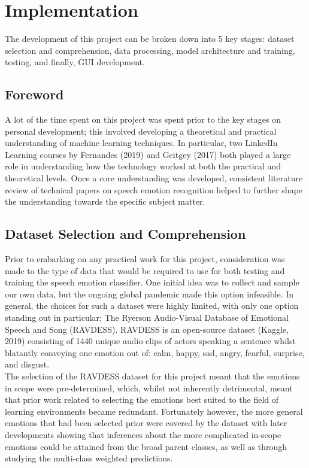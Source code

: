\documentclass[12pt]{article}
\begin{document}
\section{Implementation}
The development of this project can be broken down into 5 key stages: dataset selection and comprehension, data processing, model architecture and training, testing, and finally, GUI development.
\subsection{Foreword}
A lot of the time spent on this project was spent prior to the key stages on personal development; this involved developing a theoretical and practical understanding of machine learning techniques. In particular, two LinkedIn Learning courses by Fernandes (2019) and Geitgey (2017) both played a large role in understanding how the technology worked at both the practical and theoretical levels. Once a core understanding was developed, consistent literature review of technical papers on speech emotion recognition helped to further shape the understanding towards the specific subject matter. 
\subsection{Dataset Selection and Comprehension}
Prior to embarking on any practical work for this project, consideration was made to the type of data that would be required to use for both testing and training the speech emotion classifier. One initial idea was to collect and sample our own data, but the ongoing global pandemic made this option infeasible. In general, the choices for such a dataset were highly limited, with only one option standing out in particular; The Ryerson Audio-Visual Database of Emotional Speech and Song (RAVDESS). RAVDESS is an open-source dataset (Kaggle, 2019) consisting of 1440 unique audio clips of actors speaking a sentence whilst blatantly conveying one emotion out of: calm, happy, sad, angry, fearful, surprise, and disgust.
\\

\noindent The selection of the RAVDESS dataset for this project meant that the emotions in scope were pre-determined, which, whilst not inherently detrimental, meant that prior work related to selecting the emotions best suited to the field of learning environments became redundant. Fortunately however, the more general emotions that had been selected prior were covered by the dataset with later developments showing that inferences about the more complicated in-scope emotions could be attained from the broad parent classes, as well as through studying the multi-class weighted predictions.
\end{document}
